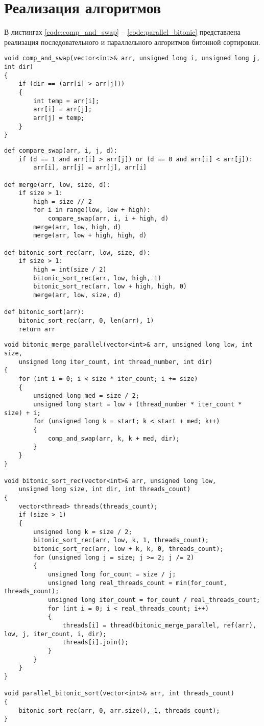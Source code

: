 \section{Реализация алгоритмов}

В листингах \ref{code:comp_and_swap} -- \ref{code:parallel_bitonic} представлена реализация последовательного и параллельного алгоритмов битонной сортировки.
\newpage

\begin{lstlisting}[label=code:comp_and_swap,caption=Реализация вспомогательной функции обмена значениями элементов в массиве]
void comp_and_swap(vector<int>& arr, unsigned long i, unsigned long j, 
int dir)
{
	if (dir == (arr[i] > arr[j]))
	{
		int temp = arr[i];
		arr[i] = arr[j];
		arr[j] = temp;
	}
}
\end{lstlisting}


\begin{lstlisting}[label=code:bitonic,caption=Реализация последовательного алгоритма битонной сортировки]
def compare_swap(arr, i, j, d):
	if (d == 1 and arr[i] > arr[j]) or (d == 0 and arr[i] < arr[j]):
		arr[i], arr[j] = arr[j], arr[i]

def merge(arr, low, size, d):
	if size > 1:
		high = size // 2
		for i in range(low, low + high):
			compare_swap(arr, i, i + high, d)
		merge(arr, low, high, d)
		merge(arr, low + high, high, d)

def bitonic_sort_rec(arr, low, size, d):
	if size > 1:
		high = int(size / 2)
		bitonic_sort_rec(arr, low, high, 1)
		bitonic_sort_rec(arr, low + high, high, 0)
		merge(arr, low, size, d)

def bitonic_sort(arr):
	bitonic_sort_rec(arr, 0, len(arr), 1)
	return arr
\end{lstlisting}

\begin{lstlisting}[label=code:parallel_bitonic,caption=Реализация параллельного алгоритма битонной сортировки]
void bitonic_merge_parallel(vector<int>& arr, unsigned long low, int size, 
	unsigned long iter_count, int thread_number, int dir)
{
	for (int i = 0; i < size * iter_count; i += size)
	{
		unsigned long med = size / 2;
		unsigned long start = low + (thread_number * iter_count * size) + i;
		for (unsigned long k = start; k < start + med; k++)
		{
			comp_and_swap(arr, k, k + med, dir);
		}
	}
}

void bitonic_sort_rec(vector<int>& arr, unsigned long low, 
	unsigned long size, int dir, int threads_count)
{
	vector<thread> threads(threads_count);
	if (size > 1)
	{
		unsigned long k = size / 2;
		bitonic_sort_rec(arr, low, k, 1, threads_count);
		bitonic_sort_rec(arr, low + k, k, 0, threads_count);
		for (unsigned long j = size; j >= 2; j /= 2)
		{
			unsigned long for_count = size / j;
			unsigned long real_threads_count = min(for_count, threads_count);
			unsigned long iter_count = for_count / real_threads_count;
			for (int i = 0; i < real_threads_count; i++)
			{
				threads[i] = thread(bitonic_merge_parallel, ref(arr), low, j, iter_count, i, dir);
				threads[i].join();
			}
		}
	}
}

void parallel_bitonic_sort(vector<int>& arr, int threads_count)
{
	bitonic_sort_rec(arr, 0, arr.size(), 1, threads_count);
}
\end{lstlisting}

